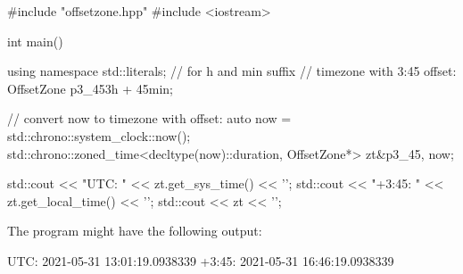 \begin{cpp}
#include "offsetzone.hpp"
#include <iostream>

int main()
{
	using namespace std::literals; // for h and min suffix
	// timezone with 3:45 offset:
	OffsetZone p3_45{3h + 45min};
	
	// convert now to timezone with offset:
	auto now = std::chrono::system_clock::now();
	std::chrono::zoned_time<decltype(now)::duration, OffsetZone*> zt{&p3_45, now};
	
	std::cout << "UTC: " << zt.get_sys_time() << '\n';
	std::cout << "+3:45: " << zt.get_local_time() << '\n';
	std::cout << zt << '\n';
}
\end{cpp}

The program might have the following output:

\begin{shell}
UTC:    2021-05-31 13:01:19.0938339
+3:45:  2021-05-31 16:46:19.0938339
\end{shell}











